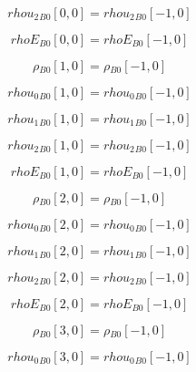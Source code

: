 \documentclass{article}
\begin{document}
\begin{dmath}{rhou_{2}{_{B0}}}[{0,0}] = {rhou_{2}{_{B0}}}[{-1,0}]\end{dmath}

\begin{dmath}{rhoE{_{B0}}}[{0,0}] = {rhoE{_{B0}}}[{-1,0}]\end{dmath}

\begin{dmath}{\rho{_{B0}}}[{1,0}] = {\rho{_{B0}}}[{-1,0}]\end{dmath}

\begin{dmath}{rhou_{0}{_{B0}}}[{1,0}] = {rhou_{0}{_{B0}}}[{-1,0}]\end{dmath}

\begin{dmath}{rhou_{1}{_{B0}}}[{1,0}] = {rhou_{1}{_{B0}}}[{-1,0}]\end{dmath}

\begin{dmath}{rhou_{2}{_{B0}}}[{1,0}] = {rhou_{2}{_{B0}}}[{-1,0}]\end{dmath}

\begin{dmath}{rhoE{_{B0}}}[{1,0}] = {rhoE{_{B0}}}[{-1,0}]\end{dmath}

\begin{dmath}{\rho{_{B0}}}[{2,0}] = {\rho{_{B0}}}[{-1,0}]\end{dmath}

\begin{dmath}{rhou_{0}{_{B0}}}[{2,0}] = {rhou_{0}{_{B0}}}[{-1,0}]\end{dmath}

\begin{dmath}{rhou_{1}{_{B0}}}[{2,0}] = {rhou_{1}{_{B0}}}[{-1,0}]\end{dmath}

\begin{dmath}{rhou_{2}{_{B0}}}[{2,0}] = {rhou_{2}{_{B0}}}[{-1,0}]\end{dmath}

\begin{dmath}{rhoE{_{B0}}}[{2,0}] = {rhoE{_{B0}}}[{-1,0}]\end{dmath}

\begin{dmath}{\rho{_{B0}}}[{3,0}] = {\rho{_{B0}}}[{-1,0}]\end{dmath}

\begin{dmath}{rhou_{0}{_{B0}}}[{3,0}] = {rhou_{0}{_{B0}}}[{-1,0}]\end{dmath}
\end{document}
